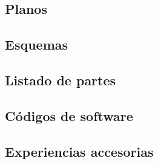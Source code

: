
  \subsection{Planos}  

  \newpage




  \subsection{Esquemas}  

  \newpage



  \subsection{Listado de partes}  

  \newpage




  \subsection{Códigos de software}  

  \newpage




  \subsection{Experiencias accesorias}  

